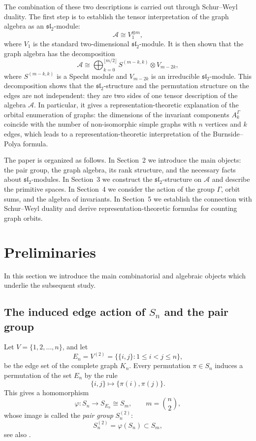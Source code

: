 \documentclass[12pt,reqno]{amsart}
\begin{document}
The combination of these two descriptions is carried out through Schur--Weyl
duality. The first step is to establish the tensor interpretation of the graph
algebra as an $\mathfrak{sl}_2$-module:
$$
\mathcal A\cong V_1^{\otimes m},
$$
where $V_1$ is the standard two-dimensional $\mathfrak{sl}_2$-module. It is
then shown that the graph algebra has the decomposition
$$
\mathcal A
\cong
\bigoplus_{k=0}^{\lfloor m/2\rfloor}
S^{(m-k,k)}\otimes V_{m-2k},
$$
where $S^{(m-k,k)}$ is a Specht module and $V_{m-2k}$ is an irreducible
$\mathfrak{sl}_2$-module. This decomposition shows that the
$\mathfrak{sl}_2$-structure and the permutation structure on the edges are not
independent: they are two sides of one tensor description of the algebra
$\mathcal A$. In particular, it gives a representa\-tion-theoretic explanation
of the orbital enumeration of graphs: the dimensions of the invariant
components $A_k^\Gamma$ coincide with the number of non-isomorphic simple
graphs with $n$ vertices and $k$ edges, which leads to a representation-theoretic
interpretation of the Burnside--Polya formula.

The paper is organized as follows. In Section~2 we introduce the main objects:
the pair group, the graph algebra, its rank structure, and the necessary facts
about $\mathfrak{sl}_2$-modules. In Section~3 we construct the
$\mathfrak{sl}_2$-structure on $\mathcal A$ and describe the primitive spaces.
In Section~4 we consider the action of the group $\Gamma$, orbit sums, and the
algebra of invariants. In Section~5 we establish the connection with
Schur--Weyl duality and derive representation-theoretic formulas for counting
graph orbits.





\section{Preliminaries}


In this section we introduce the main combinatorial and algebraic objects
which underlie the subsequent study.

\subsection{The induced edge action of $S_n$ and the pair group}\label{ss2.1}

Let $V=\{1,2,\ldots,n\}$, and let
$$
E_n=V^{(2)}=\{\{i,j\}:1\le i<j\le n\},
$$
be the edge set of the complete graph $K_n$.
Every permutation $\pi\in S_n$ induces a permutation of the set $E_n$ by the
rule
$$
\{i,j\}\mapsto \{\pi(i),\pi(j)\}.
$$
This gives a homomorphism
$$
\varphi:S_n\longrightarrow S_{E_n}\cong S_{m}, \qquad m=\binom{n}{2},
$$
whose image is called the \textit{pair group} $S_n^{(2)}$:
$$
S_n^{(2)}=\varphi(S_n)\subset S_{m},
$$
see also \cite[Chapter 4]{H-P}.
\end{document}
